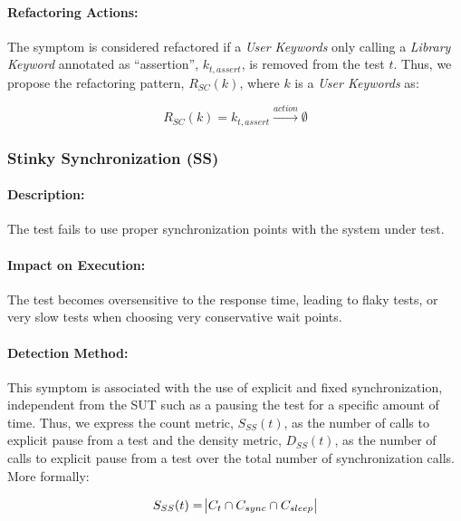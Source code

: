 \paragraph{Refactoring Actions:}

The symptom is considered refactored if a \emph{User Keywords} only calling a \emph{Library Keyword} annotated as ``assertion'', $k_{t, assert}$, is removed from the test $t$. Thus, we propose the refactoring pattern, $R_{SC}(k)$, where $k$ is a \emph{User Keywords} as:

\begin{equation*}
    R_{SC}(k) = k_{t, assert} \xrightarrow{action} \emptyset
\end{equation*}

\subsubsection{Stinky Synchronization (SS)}

\paragraph{Description:}

The test fails to use proper synchronization points with the system under test.

\paragraph{Impact on Execution:} 

The test becomes oversensitive to the response time, leading to flaky tests, or very slow tests when choosing very conservative wait points.

\paragraph{Detection Method:}

This symptom is associated with the use of explicit and fixed synchronization, independent from the SUT such as a pausing the test for a specific amount of time. Thus, we express the count metric, $S_{SS}(t)$, as the number of calls to explicit pause from a test and the density metric, $D_{SS}(t)$, as the number of calls to explicit pause from a test over the total number of synchronization calls. More formally:

\begin{equation*}
    S_{SS}(t) = \abs{C_{t} \cap C_{sync} \cap C_{sleep}}
\end{equation*}

